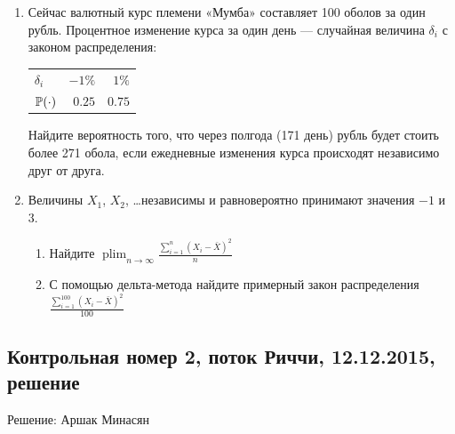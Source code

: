 \documentclass[12pt, a4paper]{article}\usepackage[]{graphicx}\usepackage[]{color}
\DeclareMathOperator*\plim{plim}
\begin{document}
\begin{enumerate}
\item Сейчас валютный курс племени «Мумба» составляет 100 оболов за один рубль. Процентное изменение курса за один день — случайная величина $\delta_i$ с законом распределения:

\begin{center}
\begin{tabular}{lrr}
\toprule
$\delta_i$ & $-1\%$  & $1\%$ \\
$\P(\cdot)$ & $0.25$  & $0.75$ \\
\bottomrule
\end{tabular}
\end{center}

Найдите вероятность того, что через полгода (171 день) рубль будет стоить более 271 обола, если ежедневные изменения курса происходят независимо друг от друга.

\item Величины $X_1$, $X_2$, \ldots независимы и равновероятно принимают значения $-1$ и $3$.
\begin{enumerate}
\item Найдите $\plim_{n\to\infty} \frac{\sum_{i=1}^n(X_i-\bar X)^2}{n}$
\item С помощью дельта-метода найдите примерный закон распределения $\frac{\sum_{i=1}^{100}(X_i-\bar X)^2}{100}$
\end{enumerate}

\end{enumerate}

\subsection{Контрольная номер 2, поток Риччи, 12.12.2015, решение}

Решение: Аршак Минасян
\end{document}
